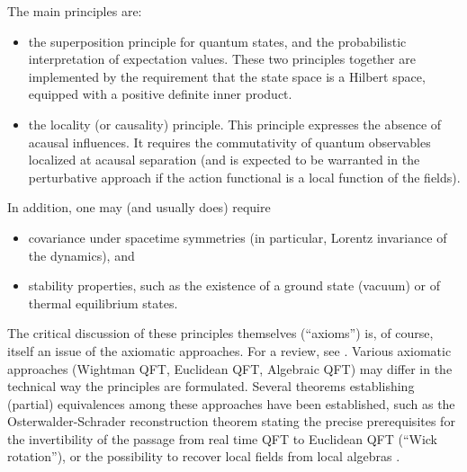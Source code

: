 \documentclass[multphys,vecphys]{svmult}
\begin{document}
The main principles are: 
\begin{itemize}
\item the superposition principle for
  quantum states, and the probabilistic 
  interpretation of expectation values. These two principles together
  are implemented by the requirement that the state
  space is a Hilbert space, equipped with a
  positive definite inner product. 
\item the locality (or causality)
  principle. This principle expresses the absence of acausal
  influences. It requires the commutativity of quantum observables
  localized at acausal separation (and is expected 
  to be warranted in the perturbative
  approach if the action functional is a local function of the fields). 
\end{itemize}
In addition, one may (and usually does) require 
\begin{itemize}
\item covariance under spacetime symmetries (in
  particular, Lorentz invariance of the dynamics), and 
\item stability properties, such as the existence of a
  ground state (vacuum) or of
  thermal equilibrium states.     
\end{itemize}
The critical discussion of these principles themselves (``axioms'') is, 
of course, itself an issue of the axiomatic
approaches. For a review, see \cite{BH}. Various axiomatic approaches
(Wightman QFT, Euclidean
QFT, Algebraic QFT) may differ in the
technical way the principles are formulated.  Several theorems
establishing (partial) equivalences among these approaches have been
established, such as the Osterwalder-Schrader reconstruction theorem
\cite{OS} stating the precise prerequisites for the invertibility of
the passage from real time QFT to Euclidean QFT (``Wick rotation''),
or the possibility to recover local fields from local algebras \cite{Bos}.
\end{document}

